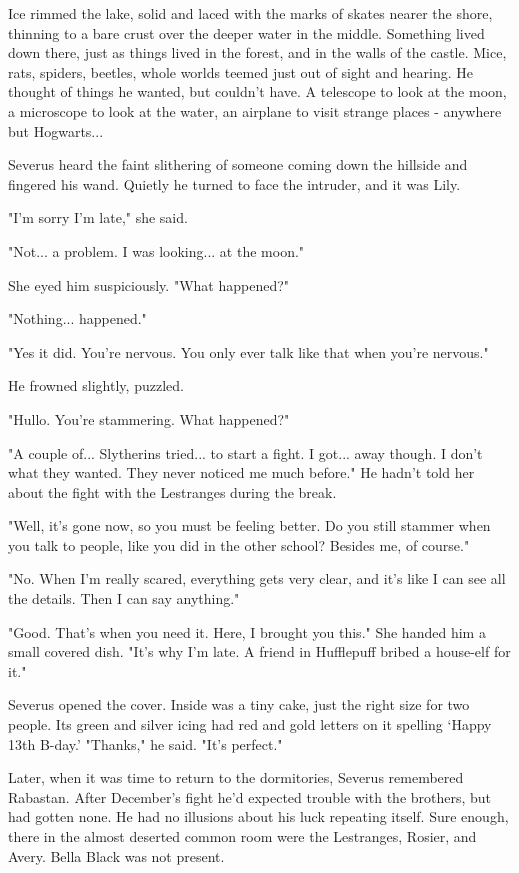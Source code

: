 \documentclass[a4paper,11pt]{article}
\begin{document}
Ice rimmed the lake, solid and laced with the marks of skates nearer the shore, thinning to a bare crust over the deeper water in the middle. Something lived down there, just as things lived in the forest, and in the walls of the castle. Mice, rats, spiders, beetles, whole worlds teemed just out of sight and hearing. He thought of things he wanted, but couldn't have. A telescope to look at the moon, a microscope to look at the water, an airplane to visit strange places - anywhere but Hogwarts...

Severus heard the faint slithering of someone coming down the hillside and fingered his wand. Quietly he turned to face the intruder, and it was Lily.

"I'm sorry I'm late," she said.

"Not... a problem. I was looking... at the moon."

She eyed him suspiciously. "What happened?"

"Nothing... happened."

"Yes it did. You're nervous. You only ever talk like that when you're nervous."

He frowned slightly, puzzled.

"Hullo. You're stammering. What happened?"

"A couple of... Slytherins tried... to start a fight. I got... away though. I don't what they wanted. They never noticed me much before." He hadn't told her about the fight with the Lestranges during the break.

"Well, it's gone now, so you must be feeling better. Do you still stammer when you talk to people, like you did in the other school? Besides me, of course."

"No. When I'm really scared, everything gets very clear, and it's like I can see all the details. Then I can say anything."

"Good. That's when you need it. Here, I brought you this." She handed him a small covered dish. "It's why I'm late. A friend in Hufflepuff bribed a house-elf for it."

Severus opened the cover. Inside was a tiny cake, just the right size for two people. Its green and silver icing had red and gold letters on it spelling `Happy 13th B-day.' "Thanks," he said. "It's perfect."

Later, when it was time to return to the dormitories, Severus remembered Rabastan. After December's fight he'd expected trouble with the brothers, but had gotten none. He had no illusions about his luck repeating itself. Sure enough, there in the almost deserted common room were the Lestranges, Rosier, and Avery. Bella Black was not present.
\end{document}
